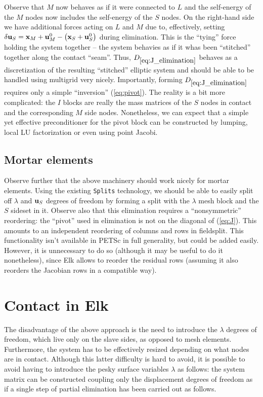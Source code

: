 \documentclass[11pt]{article}
\newcommand{\vecx}{{\bf x}}
\newcommand{\vecu}{{\bf u}}
\begin{document}
Observe that $M$ now behaves as if it were connected to $L$ and the self-energy of the $M$ nodes now includes the self-energy of the $S$ nodes.
On the right-hand side we have additional forces acting on $L$ and $M$ due to, effectively, setting $\delta \vecu_S = \vecx_M + \vecu_M^0 - \left(\vecx_S+\vecu_S^0\right)$ during elimination.
This is the ``tying'' force holding the system together -- the system behavies as if it whas been ``stitched'' together along the contact ``seam''.
Thus, $D_{\ref{eq:J_elimination}}$ behaves as a discretization of the resulting ``stitched'' elliptic system and should be able to be handled using multigrid
very nicely. Importantly, forming $D_{\ref{eq:J_elimination}}$ requires only a simple ``inversion'' (\ref{eq:pivot}).  The reality is a bit more complicated:
the $I$ blocks are really the mass matrices of the $S$ nodes in contact and the corresponding $M$ side nodes.  Nonetheless, we can expect that a simple yet
effective preconditioner for the pivot block can be constructed by lumping, local LU factorization or even using point Jacobi.

\subsection{Mortar elements}
Observe further that the above machinery should work nicely for mortar elements.  Using the existing \texttt{Splits} technology, we should be able to easily
split off $\lambda$ and $\vecu_S$ degrees of freedom by forming a split with the $\lambda$ mesh block and the $S$ sideset in it.
Observe also that this elimination requires a ``nonsymmetric'' reordering: the ``pivot'' used in elimination is not on the diagonal of (\ref{eq:J}).
This amounts to an independent reordering of columns and rows in fieldsplit.
This functionality isn't available in PETSc in full generality, but could be added easily.  However, it is unnecessary to do so (although it may be
useful to do it nonetheless), since Elk allows to reorder the residual rows (assuming it also reorders the Jacobian rows in a compatible way).


\section{Contact in Elk}
The disadvantage of the above approach is the need to introduce the $\lambda$ degrees of freedom, which live only on the slave sides, as opposed to mesh elements.
Furthermore, the system has to be effectively resized depending on what nodes are in contact.  Although this latter difficulty is hard to avoid, it is possible
to avoid having to introduce the pesky surface variables $\lambda$ as follows: the system matrix can be constructed coupling only the displacement degrees of
freedom as if a single step of partial elimination has been carried out as follows.
\end{document}
